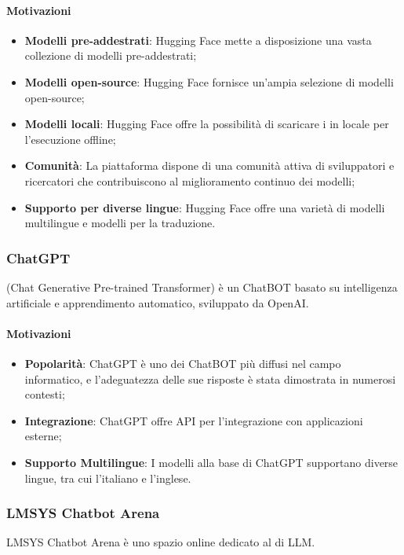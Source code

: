 \paragraph*{Motivazioni}
\begin{itemize}
  \item \textbf{Modelli pre-addestrati}: Hugging Face mette a disposizione una vasta collezione di modelli pre-addestrati;
  \item \textbf{Modelli open-source}: Hugging Face fornisce un'ampia selezione di modelli open-source;
  \item \textbf{Modelli locali}: Hugging Face offre la possibilità di scaricare i  in locale per l’esecuzione offline;
  \item \textbf{Comunità}: La piattaforma dispone di una comunità attiva di sviluppatori e ricercatori che contribuiscono al miglioramento continuo dei modelli;
  \item \textbf{Supporto per diverse lingue}: Hugging Face offre una varietà di modelli multilingue e modelli per la traduzione.
\end{itemize}

\subsubsection{ChatGPT}\label{sec:chatgpt}
\par {} (Chat Generative Pre-trained Transformer) è un ChatBOT basato su intelligenza artificiale e apprendimento automatico, sviluppato da OpenAI.
\paragraph*{Motivazioni}
\begin{itemize}
  \item \textbf{Popolarità}: ChatGPT è uno dei ChatBOT più diffusi nel campo informatico, e l'adeguatezza delle sue risposte è stata dimostrata in numerosi contesti;
  \item \textbf{Integrazione}: ChatGPT offre API per l'integrazione con applicazioni esterne;
  \item \textbf{Supporto Multilingue}: I modelli alla base di ChatGPT supportano diverse lingue, tra cui l'italiano e l'inglese.
\end{itemize}

\subsubsection{LMSYS Chatbot Arena}\label{sec:lmsys}
\par LMSYS Chatbot Arena è uno spazio online dedicato al  di LLM.
